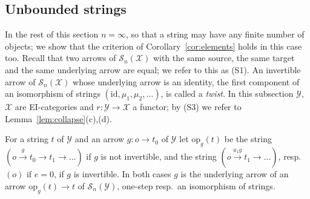 \documentclass[11pt]{amsart}
\theoremstyle{definition}
\newcommand{\cX}{\mathcal X}
\newcommand{\cS}{\mathcal S}
\newcommand{\id}{\mathrm{id}}
\newcommand{\opn}{\mathrm{op}}
\newcommand{\cY}{\mathcal Y}
\begin{document}
\subsection*{Unbounded strings}
In the rest of this section $n=\infty$, so that a string may have any
finite number of objects; we show that the criterion of
Corollary~\ref{cor:elements} holds in this case too. Recall that two
arrows of $\cS_n(\cX)$ with the same source, the same target and the
same underlying arrow are equal; we refer to this as (S1). An
invertible arrow of $\cS_n(\cX)$ whose underlying arrow is an
identity, the first component of an isomorphism of strings
$(\id,\mu_1,\mu_2,\dots)$, is called a \emph{twist}. In this
subsection $\cY$, $\cX$ are EI-categories and $r\colon\cY\to\cX$ a
functor; by (S3) we refer to Lemma~\ref{lem:collapse}(c),(d).

For a string $t$ of $\cY$ and an arrow $g\colon o\to t_0$ of $\cY$
let $\opn_g(t)$ be the string $(o\xrightarrow{g}t_0\to t_1\to\dots)$
if $g$ is not invertible, and the string $(o\xrightarrow{a_1g}t_1\to
\dots)$, resp.\ $(o)$ if $e=0$, if $g$ is invertible. In both cases
$g$ is the underlying arrow of an arrow $\opn_g(t)\to t$ of
$\cS_n(\cY)$, one-step resp.\ an isomorphism of strings.
\end{document}
